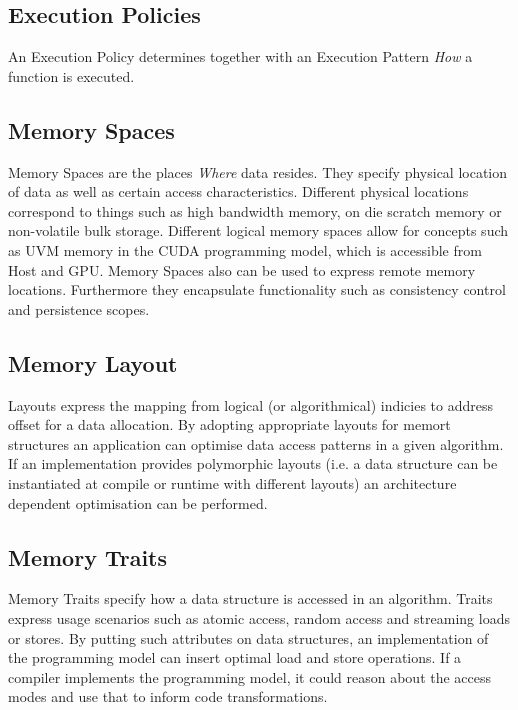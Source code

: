\subsection{Execution Policies}

An Execution Policy determines together with an Execution Pattern {\it How} a function is executed.

\subsection{Memory Spaces}

Memory Spaces are the places {\it Where} data resides.
They specify physical location of data as well as certain access characteristics. 
Different physical locations correspond to things such as high bandwidth memory, on die scratch memory or non-volatile bulk storage.
Different logical memory spaces allow for concepts such as UVM memory in the CUDA programming model, which is accessible from Host and GPU. 
Memory Spaces also can be used to express remote memory locations.
Furthermore they encapsulate functionality such as consistency control and persistence scopes.

\subsection{Memory Layout}

Layouts express the mapping from logical (or algorithmical) indicies to address offset for a data allocation. 
By adopting appropriate layouts for memort structures an application can optimise data access patterns in a given algorithm.
If an implementation provides polymorphic layouts (i.e. a data structure can be instantiated at compile or runtime with different layouts) an architecture dependent optimisation can be performed.

\subsection{Memory Traits}

Memory Traits specify how a data structure is accessed in an algorithm. 
Traits express usage scenarios such as atomic access, random access and streaming loads or stores.
By putting such attributes on data structures, an implementation of the programming model can insert optimal load and store operations.
If a compiler implements the programming model, it could reason about the access modes and use that to inform code transformations.   


